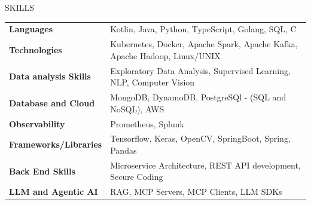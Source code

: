 \documentclass{resume} %
\begin{document}




\begin{rSection}{SKILLS}

\begin{tabular}{ @{} >{\bfseries}l @{\hspace{6ex}} l }
Languages &    Kotlin, Java, Python, TypeScript, Golang, SQL, C \\
Technologies & Kubernetes, Docker, Apache Spark, Apache Kafka, Apache Hadoop, Linux/UNIX \\
Data analysis Skills &  Exploratory Data Analysis, Supervised Learning, NLP, Computer Vision \\
Database and Cloud & MongoDB, DynamoDB, PostgreSQl - (SQL and NoSQL), AWS \\
Observability & Prometheus, Splunk \\
Frameworks/Libraries & Tensorflow, Keras, OpenCV, SpringBoot, Spring, Pandas \\
Back End Skills &  Microservice Architecture, REST API development, Secure Coding\\
LLM and Agentic AI & RAG, MCP Servers, MCP Clients, LLM SDKs \\
\end{tabular}
\end{rSection}
\end{document}
